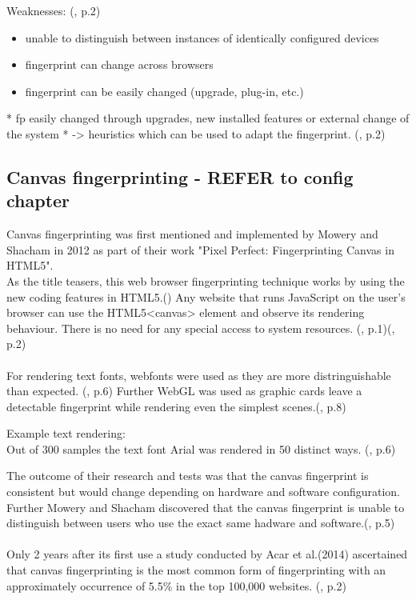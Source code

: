 Weaknesses: (\textcite{upi15}, p.2)
\begin{itemize}
	\item unable to distinguish between instances of identically configured devices
	\item fingerprint can change across browsers
	\item fingerprint can be easily changed (upgrade, plug-in, etc.)
\end{itemize}
* fp easily changed through upgrades, new installed features or external change of the system 
* -> heuristics which can be used to adapt the fingerprint.  (\textcite{upi15}, p.2)



\subsection{Canvas fingerprinting - REFER to config chapter}
Canvas fingerprinting was first mentioned and implemented by Mowery and Shacham in 2012 as part of their work "Pixel Perfect: Fingerprinting Canvas in HTML5".\\
As the title teasers, this web browser fingerprinting technique works by using the new coding features in HTML5.(\textcite{pixel18}) Any website that runs JavaScript on the user's browser can use the HTML5<canvas> element and observe its rendering behaviour. There is no need for any special access to system resources. (\textcite{mowery12}, p.1)(\textcite{upi15}, p.2)\\\\
For rendering text fonts, webfonts were used as they are more distringuishable than expected. (\textcite{mowery12}, p.6) Further WebGL was used as  graphic cards leave a detectable fingerprint while rendering even the simplest scenes.(\textcite{mowery12}, p.8)\\
\begin{tcolorbox}
	Example text rendering: \\
	Out of 300 samples the text font Arial was rendered in 50 distinct ways. (\textcite{mowery12}, p.6)
\end{tcolorbox}
The outcome of their research and tests was that the canvas fingerprint is consistent but would change depending on hardware and software configuration. Further Mowery and Shacham discovered that the canvas fingerprint is unable to distinguish between users who use the exact same hadware and software.(\textcite{mowery12}, p.5)\\\\
Only 2 years after its first use a study conducted by Acar et al.(2014) ascertained that canvas fingerprinting is the most common form of fingerprinting with an approximately occurrence of 5.5\% in the top 100,000 websites. (\textcite{upi15}, p.2)

